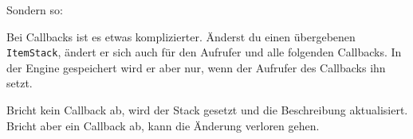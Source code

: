 Sondern so:

\begin{Shaded}
\begin{Highlighting}[]
  \OperatorTok{=} \OperatorTok{:}\OperatorTok{()}
  \OperatorTok{=} \OperatorTok{:}\OperatorTok{(}\OperatorTok{,} \OperatorTok{)}
\OperatorTok{:}\OperatorTok{():}\OperatorTok{(}\OperatorTok{,} \OperatorTok{)}
\OperatorTok{:}\OperatorTok{(}\OperatorTok{,} \OperatorTok{,} \OperatorTok{)}
\end{Highlighting}
\end{Shaded}

Bei Callbacks ist es etwas komplizierter.
Änderst du einen übergebenen \texttt{ItemStack}, ändert er sich auch für
den Aufrufer und alle folgenden Callbacks. In der Engine gespeichert
wird er aber nur, wenn der Aufrufer des Callbacks ihn setzt.

\begin{Shaded}
\begin{Highlighting}[]
\OperatorTok{(}
    \OperatorTok{(}
        \OperatorTok{,}
        \OperatorTok{,}
        \OperatorTok{,}
        \OperatorTok{,}
    \OperatorTok{)}
            \OperatorTok{:}\OperatorTok{()}
            \OperatorTok{:}\OperatorTok{(}\OperatorTok{,} \OperatorTok{)}
\OperatorTok{)}
\end{Highlighting}
\end{Shaded}

Bricht kein Callback ab, wird der Stack gesetzt und die Beschreibung
aktualisiert. Bricht aber ein Callback ab, kann die Änderung verloren
gehen.

